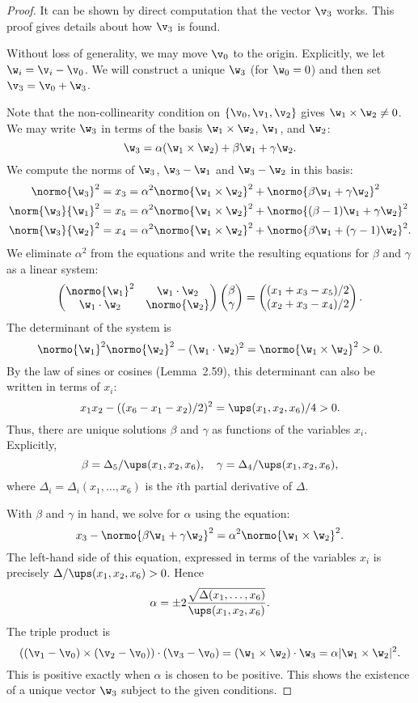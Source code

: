 \begin{proof}
It can be shown by direct computation that the vector $\v_3$ works.  This proof gives details about how
$\v_3$ is found.

Without loss of generality, we may move $\v_0$ to the origin.  Explicitly,
we let $\w_i = \v_i - \v_0$.  We will construct a unique $\w_3$ (for $\w_0=0$) and then set $\v_3 = \v_0 + \w_3$.

Note that the non-collinearity condition on $\{\v_0,\v_1,\v_2\}$ gives $\w_1\times\w_2\ne 0$.
We may write $\w_3$ in terms of the basis $\w_1\times\w_2$, $\w_1$, and $\w_2$:
\[
\w_3 = \alpha (\w_1\times \w_2) + \beta \w_1 + \gamma \w_2.
\]
We compute the norms of $\w_3$, $\w_3 - \w_1$ and $\w_3-\w_2$ in this basis:
\begin{align*}
\normo{\w_3}^2 = x_3 &= \alpha^2 \normo{\w_1\times\w_2}^2 + \normo{\beta\w_1+\gamma\w_2}^2 \\
\norm{\w_3}{\w_1}^2 = x_5 &= \alpha^2 \normo{\w_1\times\w_2}^2 + \normo{(\beta-1)\w_1 + \gamma\w_2}^2\\
\norm{\w_3}{\w_2}^2 = x_4 &= \alpha^2\normo{\w_1\times\w_2}^2 +\normo{\beta\w_1 + (\gamma-1)\w_2}^2.
\end{align*}
We eliminate $\alpha^2$ from the equations and write the resulting equations for $\beta$ and $\gamma$ as
a linear system:
\[
\left(\begin{matrix} \normo{\w_1}^2 & \w_1\cdot \w_2 \\ \w_1\cdot \w_2 & \normo{\w_2} \end{matrix}\right)
\left(\begin{matrix} \beta \\ \gamma \end{matrix}\right) = 
\left(\begin{matrix} (x_1 + x_3 - x_5)/2 \\ (x_2 + x_3 - x_4)/2 \end{matrix}\right).
\]
The determinant of the system is 
\[
\normo{\w_1}^2\normo{\w_2}^2 - (\w_1\cdot \w_2)^2 = \normo{\w_1\times \w_2}^2 >  0.
\]
By the law of sines or cosines (Lemma~2.59), this determinant can also be written in terms of $x_i$:
\[
x_1 x_2 - ((x_6 - x_1 - x_2)/2)^2 = \ups(x_1,x_2,x_6)/4 > 0.
\]
Thus, there are unique solutions $\beta$ and $\gamma$ as functions of the variables $x_i$. Explicitly,
\[
\beta = \Delta_5/\ups(x_1,x_2,x_6),\quad \gamma = \Delta_4/\ups(x_1,x_2,x_6),
\]
where $\Delta_i=\Delta_i(x_1,\ldots,x_6)$ is the $i$th partial derivative of $\Delta$.

With $\beta$ and $\gamma$ in hand, we solve for $\alpha$ using the equation:
\[
x_3 - \normo{\beta\w_1 + \gamma\w_2}^2 = \alpha^2 \normo{\w_1\times \w_2}^2.
\]
The left-hand side of this equation, expressed in terms of the variables $x_i$ is precisely $\Delta/\ups(x_1,x_2,x_6) >0$.
Hence 
\[
\alpha = \pm 2\frac{\sqrt{\Delta(x_1,\ldots,x_6)}} {\ups(x_1,x_2,x_6)}.
\]
The triple product is
\[
((\v_1 - \v_0) \times (\v_2 - \v_0)) \cdot (\v_3 - \v_0) = (\w_1 \times \w_2) \cdot \w_3 = \alpha |\w_1\times \w_2|^2.
\]
This is positive exactly when $\alpha$ is chosen to be positive.
This shows the existence of a unique vector $\w_3$ subject to the given conditions.


\end{proof}
